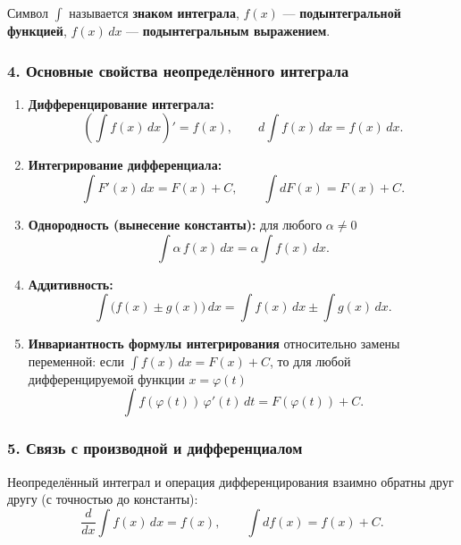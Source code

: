 Символ $\int$ называется \textbf{знаком интеграла}, $f(x)$ — \textbf{подынтегральной функцией}, $f(x)\,dx$ — \textbf{подынтегральным выражением}.

\subsubsection*{4. Основные свойства неопределённого интеграла}

\begin{enumerate}
    \item \textbf{Дифференцирование интеграла:}
    \[ \left(\int f(x)\,dx\right)' = f(x), \qquad d\!\int f(x)\,dx = f(x)\,dx. \]

    \item \textbf{Интегрирование дифференциала:}
    \[ \int F'(x)\,dx = F(x) + C, \qquad \int dF(x) = F(x) + C. \]

    \item \textbf{Однородность (вынесение константы):} для любого $\alpha \neq 0$
    \[ \int \alpha\, f(x)\,dx = \alpha \int f(x)\,dx. \]

    \item \textbf{Аддитивность:}
    \[ \int \bigl(f(x) \pm g(x)\bigr)\,dx = \int f(x)\,dx \pm \int g(x)\,dx. \]

    \item \textbf{Инвариантность формулы интегрирования} относительно замены переменной: если
    $\int f(x)\,dx = F(x) + C$, то для любой дифференцируемой функции $x = \varphi(t)$
    \[ \int f(\varphi(t))\,\varphi'(t)\,dt = F(\varphi(t)) + C. \]
\end{enumerate}

\subsubsection*{5. Связь с производной и дифференциалом}

Неопределённый интеграл и операция дифференцирования взаимно обратны друг другу (с точностью до константы):
\[ \frac{d}{dx}\int f(x)\,dx = f(x), \qquad \int df(x) = f(x) + C. \]
